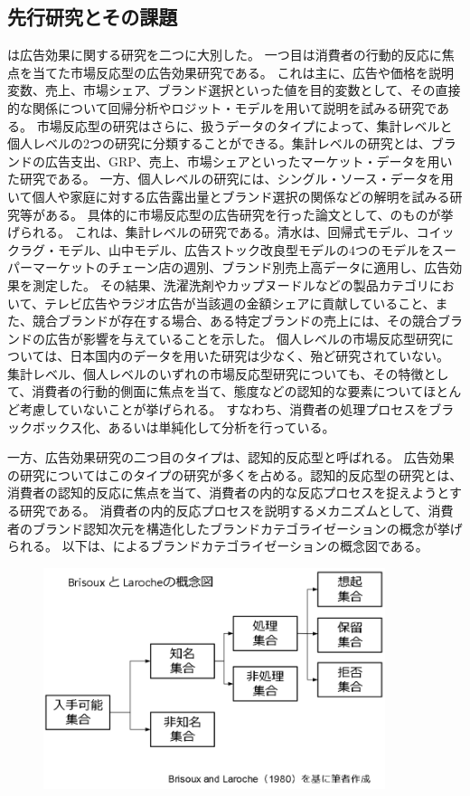 \documentclass[11pt]{jsarticle}
\begin{document}
\subsection{先行研究とその課題}
\label{sec:previous_research}
\citet{sunaga2008}は広告効果に関する研究を二つに大別した。
一つ目は消費者の行動的反応に焦点を当てた市場反応型の広告効果研究である。
これは主に、広告や価格を説明変数、売上、市場シェア、ブランド選択といった値を目的変数として、その直接的な関係について回帰分析やロジット・モデルを用いて説明を試みる研究である。
市場反応型の研究はさらに、扱うデータのタイプによって、集計レベルと個人レベルの2つの研究に分類することができる。集計レベルの研究とは、ブランドの広告支出、GRP、売上、市場シェアといったマーケット・データを用いた研究である。
一方、個人レベルの研究には、シングル・ソース・データを用いて個人や家庭に対する広告露出量とブランド選択の関係などの解明を試みる研究等がある。
具体的に市場反応型の広告研究を行った論文として、\citet{shimizu1990}のものが挙げられる。
これは、集計レベルの研究である。清水は、回帰式モデル、コイックラグ・モデル、山中モデル、広告ストック改良型モデルの4つのモデルをスーパーマーケットのチェーン店の週別、ブランド別売上高データに適用し、広告効果を測定した。
その結果、洗濯洗剤やカップヌードルなどの製品カテゴリにおいて、テレビ広告やラジオ広告が当該週の金額シェアに貢献していること、また、競合ブランドが存在する場合、ある特定ブランドの売上には、その競合ブランドの広告が影響を与えていることを示した。
個人レベルの市場反応型研究については、日本国内のデータを用いた研究は少なく、殆ど研究されていない。
集計レベル、個人レベルのいずれの市場反応型研究についても、その特徴として、消費者の行動的側面に焦点を当て、態度などの認知的な要素についてほとんど考慮していないことが挙げられる。
すなわち、消費者の処理プロセスをブラックボックス化、あるいは単純化して分析を行っている。

一方、広告効果研究の二つ目のタイプは、認知的反応型と呼ばれる。
広告効果の研究についてはこのタイプの研究が多くを占める。認知的反応型の研究とは、消費者の認知的反応に焦点を当て、消費者の内的な反応プロセスを捉えようとする研究である。
消費者の内的反応プロセスを説明するメカニズムとして、消費者のブランド認知次元を構造化したブランドカテゴライゼーションの概念が挙げられる。
以下は、\citet{brisoux1980}によるブランドカテゴライゼーションの概念図である。

\begin{figure}[htbp]
 \centering
 \includegraphics[width=10cm]{./fig/1-1_brand_categorization.png}
 \label{fig:brand_categorization}
\end{figure}
\end{document}
